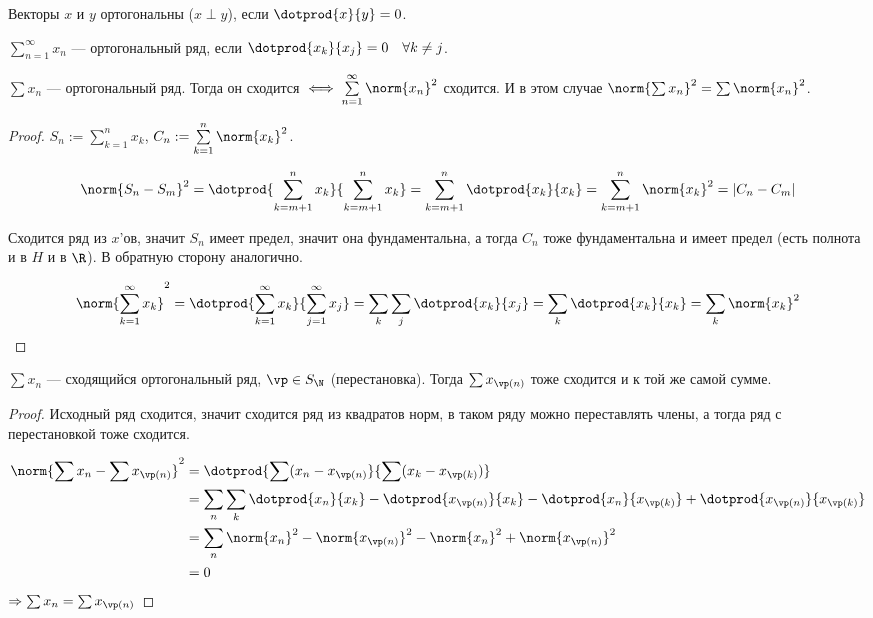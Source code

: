 \begin{definition}
    Векторы $x$ и $y$ ортогональны ($x \perp y$), если $\dotprod{x}{y} = 0$.
\end{definition}
\begin{definition}
    $\sum\limits_{n=1}^\infty x_n$ --- ортогональный ряд, если
    $\dotprod{x_k}{x_j} = 0\quad \forall k \neq j$.
\end{definition}

\begin{theorem}
    $\sum x_n$ --- ортогональный ряд. Тогда он сходится $\iff \sum\limits_{n=1}^\infty \norm{x_n}^2$ сходится.
    И в этом случае $\norm{\sum x_n}^2 = \sum \norm{x_n}^2$.
\end{theorem}
\begin{proof}
    $S_n := \sum\limits_{k=1}^n x_k$, $C_n := \sum\limits_{k=1}^n \norm{x_k}^2$.

    \[\norm{S_n - S_m}^2 = \dotprod{\sum\limits_{k=m+1}^n x_k}{\sum\limits_{k=m+1}^n x_k}
        = \sum\limits_{k=m+1}^n \dotprod{x_k}{x_k} = \sum\limits_{k=m+1}^n \norm{x_k}^2 = |C_n - C_m|
    \]

    Сходится ряд из $x$'ов, значит $S_n$ имеет предел, значит она фундаментальна, а тогда $C_n$ тоже фундаментальна и имеет предел (есть полнота и в $H$ и в $\R$). В обратную сторону аналогично.

    \[\norm{\sum\limits_{k=1}^\infty x_k}^2 = \dotprod{\sum\limits_{k=1}^\infty x_k}{\sum\limits_{j=1}^\infty x_j}
        = \sum\limits_k \sum\limits_j \dotprod{x_k}{x_j} = \sum\limits_k \dotprod{x_k}{x_k} = \sum\limits_k \norm{x_k}^2
    \]
\end{proof}

\begin{consequence}
    $\sum x_n$ --- сходящийся ортогональный ряд, $\vp \in S_\N$ (перестановка).
    Тогда $\sum x_{\vp(n)}$ тоже сходится и к той же самой сумме.
\end{consequence}
\begin{proof}
    Исходный ряд сходится, значит сходится ряд из квадратов норм, в таком ряду можно переставлять члены, а тогда ряд с перестановкой тоже сходится.

    \begin{align*}
        \norm{\sum x_n - \sum x_{\vp(n)}}^2 & = \dotprod{\sum (x_n - x_{\vp(n)}}{\sum (x_k - x_{\vp(k)})}                                                                                 \\
                                            & = \sum\limits_n \sum\limits_k \dotprod{x_n}{x_k} - \dotprod{x_{\vp(n)}}{x_k} - \dotprod{x_n}{x_{\vp(k)}} + \dotprod{x_{\vp(n)}}{x_{\vp(k)}} \\
                                            & = \sum\limits_n \norm{x_n}^2 - \norm{x_{\vp(n)}}^2 - \norm{x_n}^2 + \norm{x_{\vp(n)}}^2                                                     \\
                                            & = 0
    \end{align*}
    $\Rightarrow \sum x_n = \sum x_{\vp(n)}$
\end{proof}

